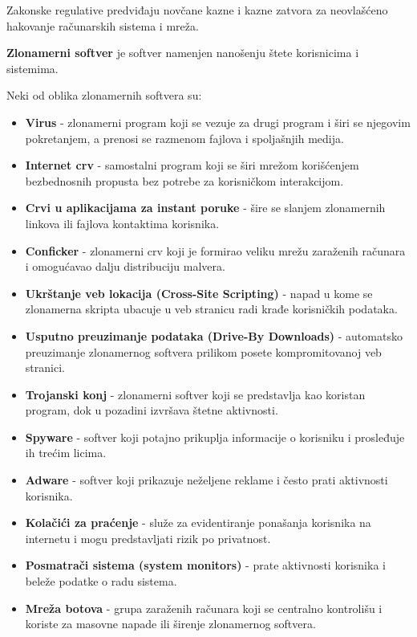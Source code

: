 \documentclass[a4paper, 12pt]{article}
\begin{document}
Zakonske regulative predviđaju novčane kazne i kazne zatvora za neovlašćeno hakovanje
računarskih sistema i mreža.

\textbf{Zlonamerni softver} je softver namenjen nanošenju štete korisnicima i sistemima.

Neki od oblika zlonamernih softvera su:
\begin{itemize}
\item \textbf{Virus} - zlonamerni program koji se vezuje za drugi program i širi
    se njegovim pokretanjem, a prenosi se razmenom fajlova i spoljašnjih medija.

    \item \textbf{Internet crv} - samostalni program koji se širi mrežom korišćenjem
    bezbednosnih propusta bez potrebe za korisničkom interakcijom.

    \item \textbf{Crvi u aplikacijama za instant poruke} - šire se slanjem zlonamernih
    linkova ili fajlova kontaktima korisnika.

    \item \textbf{Conficker} - zlonamerni crv koji je formirao veliku mrežu zaraženih
    računara i omogućavao dalju distribuciju malvera.

    \item \textbf{Ukrštanje veb lokacija (Cross-Site Scripting)} - napad u kome se
    zlonamerna skripta ubacuje u veb stranicu radi krađe korisničkih podataka.

    \item \textbf{Usputno preuzimanje podataka (Drive-By Downloads)} - automatsko
    preuzimanje zlonamernog softvera prilikom posete kompromitovanoj veb stranici.

    \item \textbf{Trojanski konj} - zlonamerni softver koji se predstavlja kao koristan
    program, dok u pozadini izvršava štetne aktivnosti.

    \item \textbf{Spyware} - softver koji potajno prikuplja informacije o korisniku i
    prosleđuje ih trećim licima.

    \item \textbf{Adware} - softver koji prikazuje neželjene reklame i često prati
    aktivnosti korisnika.

    \item \textbf{Kolačići za praćenje} - služe za evidentiranje ponašanja korisnika na
    internetu i mogu predstavljati rizik po privatnost.

    \item \textbf{Posmatrači sistema (system monitors)} - prate aktivnosti korisnika i
    beleže podatke o radu sistema.

    \item \textbf{Mreža botova} - grupa zaraženih računara koji se centralno
    kontrolišu i koriste za masovne napade ili širenje zlonamernog softvera.
\end{itemize}
\end{document}
